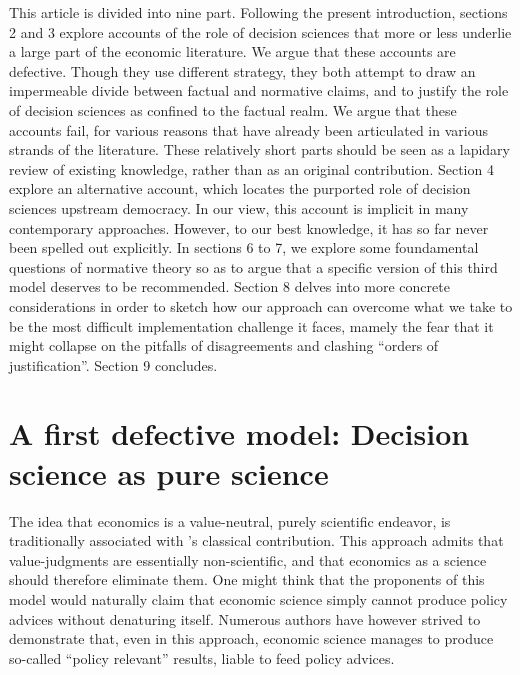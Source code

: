 \documentclass[preprint,11pt]{elsarticle}
\begin{document}
This article is divided into nine part. Following the present introduction, sections 2 and 3 explore accounts of the role of decision sciences that more or less underlie a large part of the economic literature. We argue that these accounts are defective. Though they use different strategy, they both attempt to draw an impermeable divide between factual and normative claims, and to justify the role of decision sciences as confined to the factual realm. We argue that these accounts fail, for various reasons that have already been articulated in various strands of the literature. These relatively short parts should be seen as a lapidary review of existing knowledge, rather than as an original contribution. Section 4 explore an alternative account, which locates the purported role of decision sciences upstream democracy. In our view, this account is implicit in many contemporary approaches. However, to our best knowledge, it has so far never been spelled out explicitly. In sections 6 to 7, we explore some foundamental questions of normative theory so as to argue that a specific version of this third model deserves to be recommended. Section 8 delves into more concrete considerations in order to sketch how our approach can overcome what we take to be the most difficult implementation challenge it faces, mamely the fear that it might collapse on the pitfalls of disagreements and clashing ``orders of justification''. Section 9 concludes.

\section{A first defective model: Decision science as pure science}
\noindent The idea that economics is a value-neutral, purely scientific endeavor, is traditionally associated with \cite{robbins_essay_2007}'s classical contribution. This approach admits that value-judgments are essentially non-scientific, and that economics as a science should therefore eliminate them. One might think that the proponents of this model would naturally claim that economic science simply cannot produce policy advices without denaturing itself. Numerous authors have however strived to demonstrate that, even in this approach, economic science manages to produce so-called “policy relevant” results, liable to feed policy advices.
\end{document}
